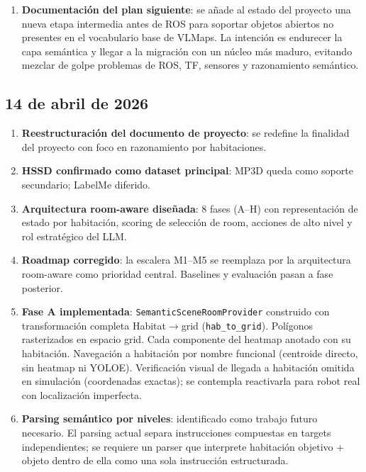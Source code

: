 \begin{enumerate}
  \item \textbf{Documentación del plan siguiente}: se añade al estado del
        proyecto una nueva etapa intermedia antes de ROS para soportar objetos
        abiertos no presentes en el vocabulario base de VLMaps. La intención es
        endurecer la capa semántica y llegar a la migración con un núcleo más
        maduro, evitando mezclar de golpe problemas de ROS, TF, sensores y
        razonamiento semántico.

\end{enumerate}

\subsection*{14 de abril de 2026}

\begin{enumerate}
  \item \textbf{Reestructuración del documento de proyecto}: se redefine la
        finalidad del proyecto con foco en razonamiento por habitaciones.
  \item \textbf{HSSD confirmado como dataset principal}: MP3D queda como soporte
        secundario; LabelMe diferido.
  \item \textbf{Arquitectura room-aware diseñada}: 8 fases (A--H) con
        representación de estado por habitación, scoring de selección de room,
        acciones de alto nivel y rol estratégico del LLM.
  \item \textbf{Roadmap corregido}: la escalera M1--M5 se reemplaza por la
        arquitectura room-aware como prioridad central. Baselines y evaluación
        pasan a fase posterior.
  \item \textbf{Fase A implementada}: \texttt{SemanticSceneRoomProvider} construido
        con transformación completa Habitat$\rightarrow$grid (\texttt{hab\_to\_grid}).
        Polígonos rasterizados en espacio grid. Cada componente del heatmap anotado
        con su habitación. Navegación a habitación por nombre funcional (centroide
        directo, sin heatmap ni YOLOE). Verificación visual de llegada a habitación
        omitida en simulación (coordenadas exactas); se contempla reactivarla para
        robot real con localización imperfecta.
  \item \textbf{Parsing semántico por niveles}: identificado como trabajo futuro
        necesario. El parsing actual separa instrucciones compuestas en targets
        independientes; se requiere un parser que interprete habitación objetivo +
        objeto dentro de ella como una sola instrucción estructurada.
\end{enumerate}

